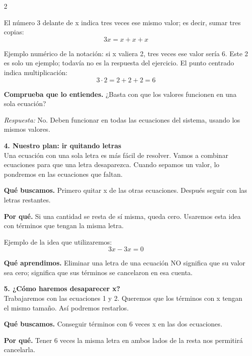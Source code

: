 \documentclass[11pt,a4paper,landscape]{article}
\begin{document}
\begin{multicols*}{2}
\begin{minipage}{\linewidth}
\par\smallskip El número 3 delante de x indica tres veces ese mismo valor; es decir, sumar tres copias:
\[3x=x+x+x\]
\par\smallskip Ejemplo numérico de la notación: si x valiera 2, tres veces ese valor sería 6. Este 2 es solo un ejemplo; todavía no es la respuesta del ejercicio. El punto centrado indica multiplicación:
\[3\cdot 2=2+2+2=6\]
\par\smallskip\textbf{Comprueba que lo entiendes.} ¿Basta con que los valores funcionen en una sola ecuación?\par\textit{Respuesta:} No. Deben funcionar en todas las ecuaciones del sistema, usando los mismos valores.
\end{minipage}\par\medskip
\noindent\begin{minipage}{\linewidth}\textbf{4. Nuestro plan: ir quitando letras}\\[2pt]Una ecuación con una sola letra es más fácil de resolver. Vamos a combinar ecuaciones para que una letra desaparezca. Cuando sepamos un valor, lo pondremos en las ecuaciones que faltan.
\par\smallskip\textbf{Qué buscamos.} Primero quitar x de las otras ecuaciones. Después seguir con las letras restantes.
\par\smallskip\textbf{Por qué.} Si una cantidad se resta de sí misma, queda cero. Usaremos esta idea con términos que tengan la misma letra.
\par\smallskip Ejemplo de la idea que utilizaremos:
\[3x-3x=0\]
\par\smallskip\textbf{Qué aprendimos.} Eliminar una letra de una ecuación NO significa que su valor sea cero; significa que sus términos se cancelaron en esa cuenta.
\end{minipage}\par\medskip
\noindent\begin{minipage}{\linewidth}\textbf{5. ¿Cómo haremos desaparecer x?}\\[2pt]Trabajaremos con las ecuaciones 1 y 2. Queremos que los términos con x tengan el mismo tamaño. Así podremos restarlos.
\par\smallskip\textbf{Qué buscamos.} Conseguir términos con 6 veces x en las dos ecuaciones.
\par\smallskip\textbf{Por qué.} Tener 6 veces la misma letra en ambos lados de la resta nos permitirá cancelarla.
\par{}\par\smallskip

\end{minipage}
\end{multicols*}
\end{document}
